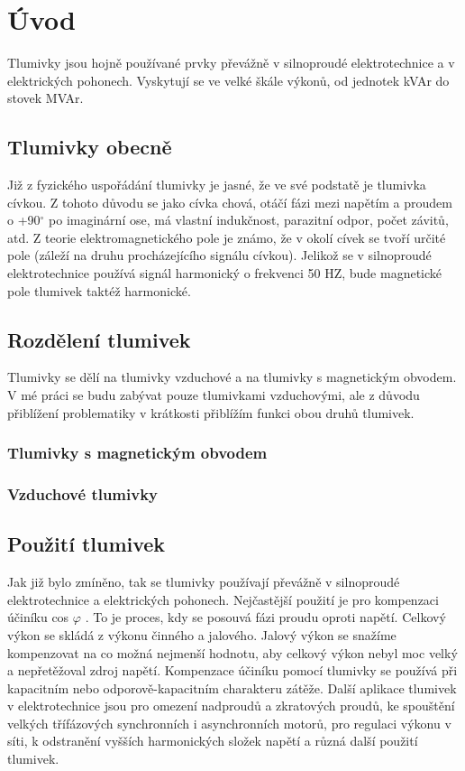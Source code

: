 \chapter{Úvod} \label{uvod}
Tlumivky jsou hojně používané prvky převážně v silnoproudé elektrotechnice a v elektrických pohonech. Vyskytují se ve velké škále výkonů, od jednotek kVAr do stovek MVAr. 
\section{Tlumivky obecně}
Již z fyzického uspořádání tlumivky je jasné, že ve své podstatě je tlumivka cívkou. Z tohoto důvodu se jako cívka chová, otáčí fázi mezi napětím a proudem o +90$^\circ$ po imaginární ose, má vlastní indukčnost, parazitní odpor, počet závitů, atd. Z teorie elektromagnetického pole je známo, že v okolí cívek se tvoří určité pole (záleží na druhu procházejícího signálu cívkou). Jelikož se v silnoproudé elektrotechnice používá signál harmonický o frekvenci 50 HZ, bude magnetické pole tlumivek taktéž harmonické. 
\section{Rozdělení tlumivek}
Tlumivky se dělí na tlumivky vzduchové a na tlumivky s magnetickým obvodem. V mé práci se budu zabývat pouze tlumivkami vzduchovými, ale z důvodu přiblížení problematiky v krátkosti přiblížím funkci obou druhů tlumivek.
\subsection{Tlumivky s magnetickým obvodem}
\subsection{Vzduchové tlumivky}
\section{Použití tlumivek}
Jak již bylo zmíněno, tak se tlumivky používají převážně v silnoproudé elektrotechnice a elektrických pohonech. Nejčastější použití je pro kompenzaci účiníku cos $\varphi$ . To je proces, kdy se posouvá fázi proudu oproti napětí. Celkový výkon se skládá z výkonu činného a jalového. Jalový výkon se snažíme kompenzovat na co možná nejmenší hodnotu, aby celkový výkon nebyl moc velký a nepřetěžoval zdroj napětí. Kompenzace účiníku pomocí tlumivky se používá při kapacitním nebo odporově-kapacitním charakteru zátěže. Další aplikace tlumivek v elektrotechnice jsou pro omezení nadproudů a zkratových proudů, ke spouštění velkých třífázových synchronních i asynchronních motorů, pro regulaci výkonu v síti, k odstranění vyšších harmonických složek napětí a různá další použití tlumivek.
